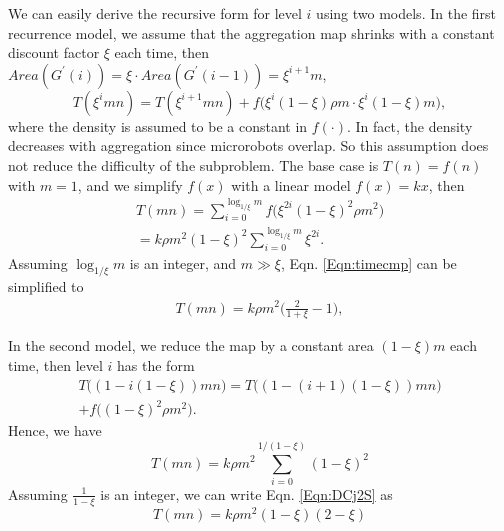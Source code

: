 We can easily derive the recursive form for level $i$ using two models. 
In the first recurrence model, we assume that the aggregation map shrinks with a constant discount factor $\xi$ each time, then $Area(G^{\prime}(i))=\xi\cdot Area(G^{\prime}(i-1))=\xi^{i+1}m$,
 \begin{equation}\label{Eqn:DCj1} 
 T(\xi^imn) = T(\xi^{i+1}mn)+f\big(\xi^{i}(1-\xi)\rho m\cdot \xi^i(1-\xi)m\big),
 \end{equation}
where the density is assumed to be a constant in $f(\cdot)$. 
In fact, the density decreases with aggregation since microrobots overlap. 
So this assumption does not reduce the difficulty of the subproblem. 
The base case is $T(n) = f(n)$ with $m = 1$, and we simplify $f(x)$ with a linear model $f(x) = kx$, then 
\begin{equation}\label{Eqn:timecmp}
\begin{split}
	T(mn) = \sum_{i=0}^{\log_{1/\xi}m} f\big(\xi^{2i}(1-\xi)^2\rho m^2\big)\\=k\rho m^2(1-\xi)^2\sum_{i=0}^{\log_{1/\xi}m}\xi^{2i}.
\end{split}
\end{equation}
Assuming $\log_{1/\xi}m$ is an integer, and $m\gg\xi$,  Eqn. \ref{Eqn:timecmp} can be simplified to
\begin{equation}\label{Eqn:timecmpS}
\begin{split}
T(mn) =k\rho m^2\big(\frac{2}{1+\xi}-1\big),
\end{split}
\end{equation}

In the second model, we reduce the map by a constant area $(1-\xi)m$ each time, then level $i$ has the form
  \begin{equation}\label{Eqn:DCj2}
  \begin{split}
 T\big( (1-i(1-\xi))mn \big) =
 T\big( (1-(i+1)(1-\xi))mn \big)\\+f\big( (1-\xi)^2\rho m^2 \big).
  \end{split} 
  \end{equation}   
Hence, we have 
\begin{equation}\label{Eqn:DCj2S}
T(mn) = k\rho m^2\sum_{i=0}^{1/(1-\xi)}(1-\xi)^2
\end{equation}
Assuming $\frac{1}{1-\xi}$ is an integer, we can write Eqn. \ref{Eqn:DCj2S} as
\begin{equation}\label{Eqn:DCj2SS}
T(mn) = k\rho m^2(1-\xi)(2-\xi)
\end{equation}
 

